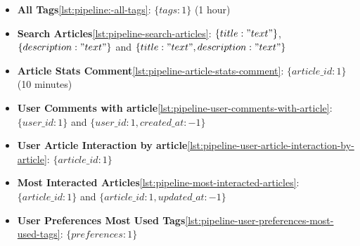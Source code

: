 \begin{itemize}
    \item \textbf{All Tags}\ref{lst:pipeline:-all-tags}: $\{ tags: 1 \}$ (1 hour)
    \item \textbf{Search Articles}\ref{lst:pipeline-search-articles}: $\{ title: "text" \}$, $\{ description: "text" \}$ and $\{ title: "text", description: "text" \}$
    \item \textbf{Article Stats Comment}\ref{lst:pipeline-article-stats-comment}: $\{ article\_id: 1 \}$ (10 minutes)
    \item \textbf{User Comments with article}\ref{lst:pipeline-user-comments-with-article}: $\{ user\_id: 1 \}$ and $\{ user\_id: 1, created\_at: -1 \}$
    \item \textbf{User Article Interaction by article}\ref{lst:pipeline-user-article-interaction-by-article}: $\{ article\_id: 1 \}$
    \item \textbf{Most Interacted Articles}\ref{lst:pipeline-most-interacted-articles}: $\{ article\_id: 1 \}$ and $\{ article\_id: 1,  updated\_at: -1\}$
    \item \textbf{User Preferences Most Used Tags}\ref{lst:pipeline-user-preferences-most-used-tags}: $\{ preferences: 1 \}$
\end{itemize}








